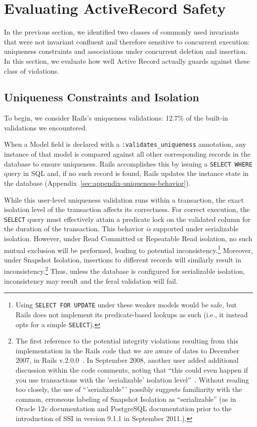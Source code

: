 
\section{Evaluating ActiveRecord Safety}
\label{sec:evaluation}

In the previous section, we identified two classes of commonly used
invariants that were not invariant confluent and therefore sensitive
to concurrent execution: uniqueness constraints and associations under
concurrent deletion and insertion. In this section, we evaluate
how well Active Record actually guards against these class of
violations. 

\subsection{Uniqueness Constraints and Isolation}

To begin, we consider Rails's uniqueness validations: 12.7\% of the
built-in validations we encountered.

When a Model field is declared with a \texttt{:validates\_uniqueness}
annotation, any instance of that model is compared against all other
corresponding records in the database to ensure uniqueness. Rails
accomplishes this by issuing a \texttt{SELECT WHERE} query in SQL and,
if no such record is found, Rails updates the instance state in the
database (Appendix~\ref{sec:appendix-uniqueness-behavior}).

While this user-level uniqueness validation runs within a transaction,
the exact isolation level of the transaction affects its
correctness. For correct execution, the \texttt{SELECT} query must
effectively attain a predicate lock on the validated column for the
duration of the transaction. This behavior \textit{is} supported under
serializable isolation. However, under Read Committed or Repeatable
Read isolation, no such mutual exclusion will be performed, leading to
potential inconsistency.\footnote{Using \texttt{SELECT FOR UPDATE}
  under these weaker models would be safe, but Rails does not
  implement its predicate-based lookups as such (i.e., it instead opts
  for a simple \texttt{SELECT}).}  Moreover, under Snapshot Isolation,
insertions to different records will similarly result in
inconsistency.\footnote{The first reference to the potential integrity
  violations resulting from this implementation in the Rails code that
  we are aware of dates to December 2007, in Rails
  v.2.0.0~\cite{code-unique-race-one}.  In September 2008, another
  user added additional discussion within the code comments, noting
  that ``this could even happen if you use transactions with the
  'serializable' isolation
  level''~\cite{code-unique-race-two}. Without reading too closely,
  the use of ``'serializable''' possibly suggests familiarity with the
  common, erroneous labeling of Snapshot Isolation as ``serializable''
  (as in Oracle 12c documentation and PostgreSQL documentation prior
  to the introduction of SSI in version 9.1.1 in September
  2011.)\label{fn:si-rails}. } Thus, unless the database is configured
for serializable isolation, inconsistency may result and the feral
validation will fail.

